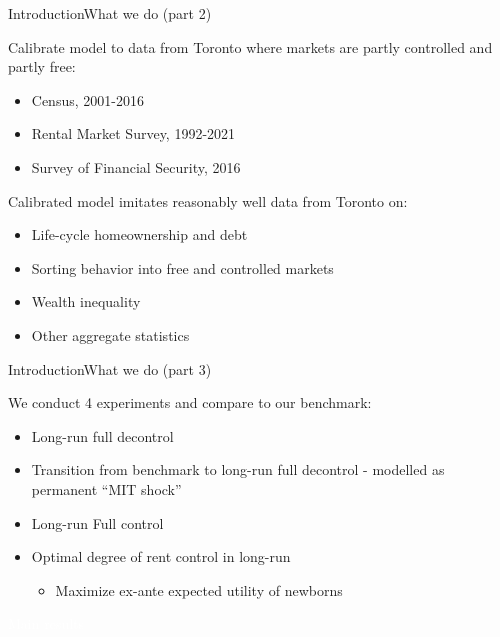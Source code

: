 \documentclass[11pt,aspectratio=169]{beamer}
\begin{document}
\begin{frame}{Introduction}{What we do (part 2)}

Calibrate model to data from Toronto where markets are partly controlled and partly free:

\begin{itemize}
    \item Census, 2001-2016
    \item Rental Market Survey, 1992-2021
    \item Survey of Financial Security, 2016
\end{itemize}

\vspace{0.5cm}

Calibrated model imitates reasonably well data from Toronto on:

\begin{itemize}
    \item Life-cycle homeownership and debt
    \item Sorting behavior into free and controlled markets
    \item Wealth inequality
    \item Other aggregate statistics
\end{itemize}
    
\end{frame}


\begin{frame}{Introduction}{What we do (part 3)}

We conduct 4 experiments and compare to our benchmark:

\begin{itemize}
    \item Long-run full decontrol
    \item Transition from benchmark to long-run full decontrol - modelled as permanent “MIT shock”
    \item Long-run Full control
    \item Optimal degree of rent control in long-run
    \begin{itemize}
        \item Maximize ex-ante expected utility of newborns \citep{conesa-et-al,gkkoc}
    \end{itemize}
\end{itemize}
    
\end{frame}

{
\begin{frame}{}

\centering \Large
\textcolor{white}{Main results}
    
\end{frame}

}
\end{document}
